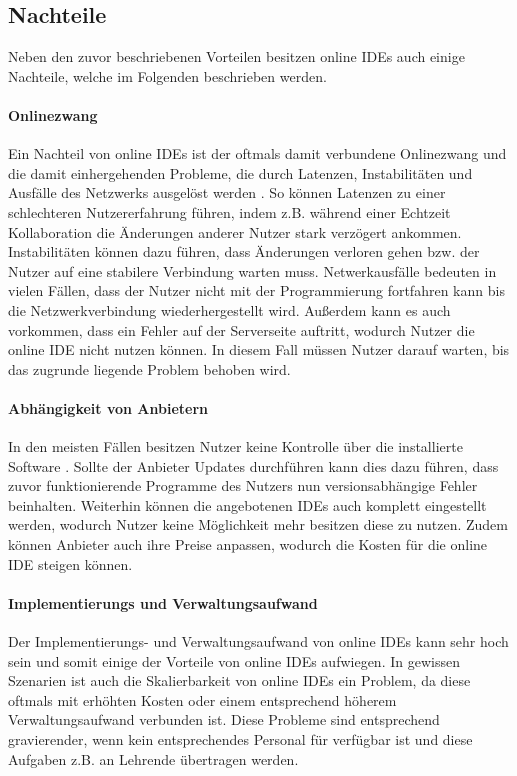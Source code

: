 \subsection{Nachteile}\label{section:stand-der-technik:literaturrecherche:nachteile}

Neben den zuvor beschriebenen Vorteilen besitzen online IDEs auch einige Nachteile, welche im Folgenden beschrieben werden.

\paragraph{Onlinezwang}
Ein Nachteil von online IDEs ist der oftmals damit verbundene Onlinezwang und die damit einhergehenden Probleme, die durch Latenzen, Instabilitäten und Ausfälle des Netzwerks ausgelöst werden \cite{kats_software_2012}\cite{leisner_good-bye_2019}. So können Latenzen zu einer schlechteren Nutzererfahrung führen, indem z.B. während einer Echtzeit Kollaboration die Änderungen anderer Nutzer stark verzögert ankommen. Instabilitäten können dazu führen, dass Änderungen verloren gehen bzw. der Nutzer auf eine stabilere Verbindung warten muss. Netwerkausfälle bedeuten in vielen Fällen, dass der Nutzer nicht mit der Programmierung fortfahren kann bis die Netzwerkverbindung wiederhergestellt wird. Außerdem kann es auch vorkommen, dass ein Fehler auf der Serverseite auftritt, wodurch Nutzer die online IDE nicht nutzen können. In diesem Fall müssen Nutzer darauf warten, bis das zugrunde liegende Problem behoben wird.

\paragraph{Abhängigkeit von Anbietern}
In den meisten Fällen besitzen Nutzer keine Kontrolle über die installierte Software \cite{kats_software_2012}. Sollte der Anbieter Updates durchführen kann dies dazu führen, dass zuvor funktionierende Programme des Nutzers nun versionsabhängige Fehler beinhalten. Weiterhin können die angebotenen IDEs auch komplett eingestellt werden, wodurch Nutzer keine Möglichkeit mehr besitzen diese zu nutzen. Zudem können Anbieter auch ihre Preise anpassen, wodurch die Kosten für die online IDE steigen können.

\paragraph{Implementierungs und Verwaltungsaufwand}
Der Implementierungs- und Verwaltungsaufwand von online IDEs kann sehr hoch sein \cite{malan_standardizing_2022} und somit einige der Vorteile von online IDEs aufwiegen. In gewissen Szenarien ist auch die Skalierbarkeit von online IDEs ein Problem, da diese oftmals mit erhöhten Kosten oder einem entsprechend höherem Verwaltungsaufwand verbunden ist. Diese Probleme sind entsprechend gravierender, wenn kein entsprechendes Personal für verfügbar ist und diese Aufgaben z.B. an Lehrende übertragen werden.


